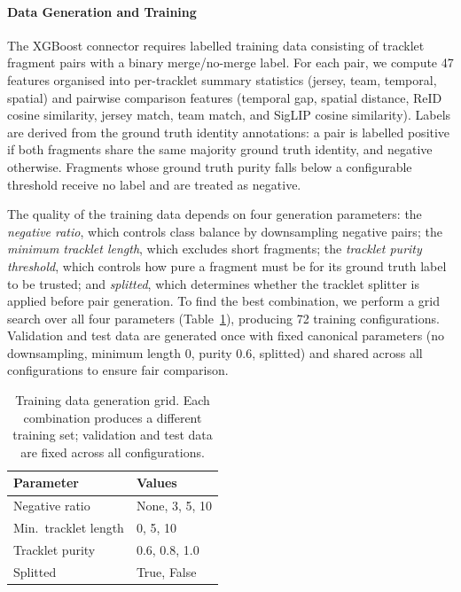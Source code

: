 \paragraph{Data Generation and Training}\label{par:data_generation}

The XGBoost connector requires labelled training data consisting of tracklet fragment pairs with a binary merge/no-merge label. For each pair, we compute 47 features organised into per-tracklet summary statistics (jersey, team, temporal, spatial) and pairwise comparison features (temporal gap, spatial distance, ReID cosine similarity, jersey match, team match, and SigLIP cosine similarity). Labels are derived from the ground truth identity annotations: a pair is labelled positive if both fragments share the same majority ground truth identity, and negative otherwise. Fragments whose ground truth purity falls below a configurable threshold receive no label and are treated as negative.

The quality of the training data depends on four generation parameters: the \emph{negative ratio}, which controls class balance by downsampling negative pairs; the \emph{minimum tracklet length}, which excludes short fragments; the \emph{tracklet purity threshold}, which controls how pure a fragment must be for its ground truth label to be trusted; and \emph{splitted}, which determines whether the tracklet splitter is applied before pair generation. To find the best combination, we perform a grid search over all four parameters (Table~\ref{tab:sweep_grid}), producing 72 training configurations. Validation and test data are generated once with fixed canonical parameters (no downsampling, minimum length 0, purity 0.6, splitted) and shared across all configurations to ensure fair comparison.

\begin{table}[H]
\centering
\begin{tabular}{ll}
\toprule
\textbf{Parameter} & \textbf{Values} \\
\midrule
Negative ratio      & None, 3, 5, 10 \\
Min.\ tracklet length & 0, 5, 10 \\
Tracklet purity     & 0.6, 0.8, 1.0 \\
Splitted            & True, False \\
\bottomrule
\end{tabular}
\caption{Training data generation grid. Each combination produces a different training set; validation and test data are fixed across all configurations.}
\label{tab:sweep_grid}
\end{table}

